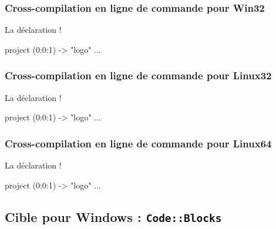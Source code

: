 \subsubsection{Cross-compilation en ligne de commande pour Win32}

La déclaration \ggs!%

\begin{galgas}
project (0:0:1) -> "logo" {
  ...
}
\end{galgas}


\subsubsection{Cross-compilation en ligne de commande pour Linux32}

La déclaration \ggs!%

\begin{galgas}
project (0:0:1) -> "logo" {
  ...
}
\end{galgas}


\subsubsection{Cross-compilation en ligne de commande pour Linux64}

La déclaration \ggs!%

\begin{galgas}
project (0:0:1) -> "logo" {
  ...
}
\end{galgas}



\subsection{Cible pour Windows : \texttt{Code::Blocks}}

